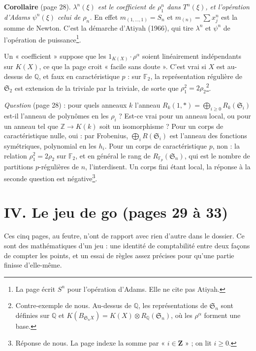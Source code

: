 \documentclass[11pt,a4paper]{article}
\begin{document}
\textbf{Corollaire} (page 28). \emph{$\lambda^{n}(\xi)$ est le coefficient de
$\rho_1^{n}$ dans $T^{n}(\xi)$, et l'opération d'Adams $\psi^{n}(\xi)$ celui
de $\rho_n$.} En effet $m_{(1, \dots, 1)} = S_n$ et $m_{(n)} = \sum
x_j^{n}$ est la somme de Newton. C'est la démarche d'Atiyah (1966), qui tire
$\lambda^{n}$ et $\psi^{n}$ de l'opération de puissance\footnote{La page
écrit $S^{n}$ pour l'opération d'Adams. Elle ne cite pas Atiyah.}.

Un « coefficient » suppose que les $1_{K(X)} \cdot \rho^{\alpha}$ soient
linéairement indépendants sur $K(X)$, ce que la page croit « facile sans
doute ». C'est vrai si $X$ est au-dessus de $\mathbb{Q}$, et faux en
caractéristique $p$ : sur $\mathbb{F}_2$, la représentation régulière de
$\mathfrak{S}_2$ est extension de la triviale par la triviale, de sorte que
$\rho_1^{2} = 2\rho_2$\footnote{Contre-exemple de nous. Au-dessus de
$\mathbb{Q}$, les représentations de $\mathfrak{S}_n$ sont définies sur
$\mathbb{Q}$ et $K(B_{\mathfrak{S}_n X}) = K(X) \otimes
R_{\mathbb{Q}}(\mathfrak{S}_n)$, où les $\rho^{\alpha}$ forment une base.}.

\emph{Question} (page 28) : pour quels anneaux $k$ l'anneau
$R_k(1, *) = \bigoplus_{i \geqslant 0} R_k(\mathfrak{S}_i)$ est-il l'anneau
de polynômes en les $\rho_i$ ? Est-ce vrai pour un anneau local, ou pour
un anneau tel que $\mathbb{Z} \to K(k)$ soit un isomorphisme ? Pour un corps
de caractéristique nulle, oui : par Frobenius,
$\bigoplus_i R(\mathfrak{S}_i)$ est l'anneau des fonctions symétriques,
polynomial en les $h_i$. Pour un corps de caractéristique $p$, non : la
relation $\rho_1^{2} = 2\rho_2$ sur $\mathbb{F}_2$, et en général le rang de
$R_{\mathbb{F}_p}(\mathfrak{S}_n)$, qui est le nombre de partitions
$p$-régulières de $n$, l'interdisent. Un corps fini étant local, la réponse
à la seconde question est négative\footnote{Réponse de nous. La page
indexe la somme par « $i \in \mathbf{Z}$ » ; on lit $i \geqslant 0$.}.

\section*{IV. Le jeu de go (pages 29 à 33)}

Ces cinq pages, au feutre, n'ont de rapport avec rien d'autre dans le
dossier. Ce sont des mathématiques d'un jeu : une identité de comptabilité
entre deux façons de compter les points, et un essai de règles assez
précises pour qu'une partie finisse d'elle-même.
\end{document}

